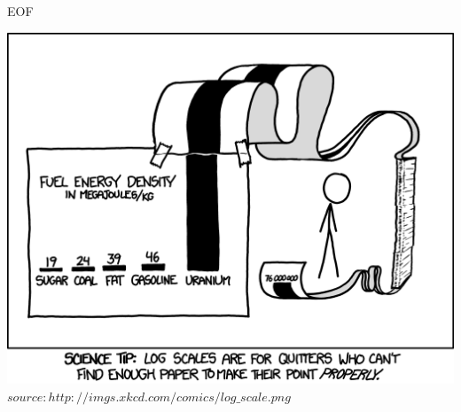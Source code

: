 		
	\begin{frame} {EOF}
		\begin{center}
			\includegraphics[scale=0.45]{graphics/eof12.png}\\
			\tiny $source: http://imgs.xkcd.com/comics/log\_scale.png$
		\end{center}
	\end{frame}


